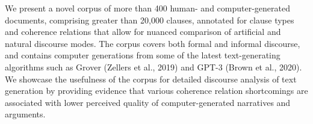 We present a novel corpus of more than 400 human- and computer-generated documents, comprising greater than 20,000 clauses, annotated for clause types and coherence relations that allow for nuanced comparison of artificial and natural discourse modes. The corpus covers both formal and informal discourse, and contains computer generations from some of the latest text-generating algorithms such as Grover (Zellers et al., 2019) and GPT-3 (Brown et al., 2020). We showcase the usefulness of the corpus for detailed discourse analysis of text generation by providing evidence that various coherence relation shortcomings are associated with lower perceived quality of computer-generated narratives and arguments.
